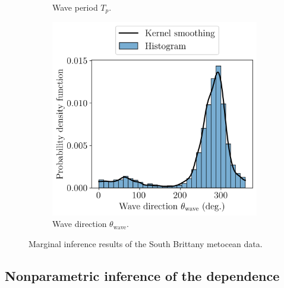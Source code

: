 \begin{figure}
\begin{subfigure}[b]{0.32\textwidth}
        \caption{Wave period $T_p$.}
    \end{subfigure}
    \begin{subfigure}[b]{0.32\textwidth}
        \centering
        \includegraphics[width=\linewidth]{../numerical_experiments/chapter3/figures/wave_dir_distribution_SB.png}
        \caption{Wave direction $\theta_{\mathrm{wave}}$.}
    \end{subfigure}
    \caption{Marginal inference results of the South Brittany metocean data.}
    \label{fig:marginals_sb}
\end{figure}


\subsection{Nonparametric inference of the dependence}

